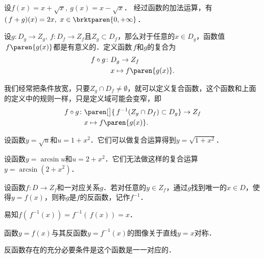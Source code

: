 \begin{example*}
  设\(f(x) = x + \sqrt x,\ g(x) = x - \sqrt x\)．
  经过函数的加法运算，有\((\,f+g)(x) = 2x,\ x \in \brktparen{0, +\infty}\)．
\end{example*}

\begin{definition*}
  设\(g\colon D_g \to Z_g,\ f\colon D_f \to Z_f\)且\(Z_g \subset D_f\)，那么对于任意的\(x \in D_g\)，函数值\(\,f\paren{g(x)}\)都是有意义的．定义函数\(\,f\)和\(g\)的复合为
  \[
    \begin{split}
      f \circ g\colon & D_g \to Z_f \\
      & x \mapsto f\paren{g(x)}.
    \end{split}
  \]

  \begin{remark}
    我们经常把条件放宽，只要\(Z_g \cap D_f \ne \emptyset\)，就可以定义复合函数，这个函数和上面的定义中的规则一样，只是定义域可能会变窄，即
    \[
      \begin{split}
        f \circ g\colon & \paren[\big]{\,f^{-1}(Z_g \cap D_f) \subset D_g} \to Z_f \\
        & x \mapsto f\paren{g(x)}.
      \end{split}
    \]
  \end{remark}
\end{definition*}

\begin{example*}
  设函数\(y = \sqrt u\)和\(u = 1+x^2\)．它们可以做复合运算得到\(y = \sqrt{1+x^2}\)．
\end{example*}

\begin{example*}
  设函数\(y = \arcsin u\)和\(u = 2+x^2\)．它们无法做这样的复合运算\(y = \arcsin(2+x^2)\)．
\end{example*}

\begin{definition}
  \label{defn:funcinv}
  设函数\(f\colon D \to Z_f\)和一对应关系\(g\)．若对任意的\(y \in Z_f\)，通过\(g\)找到唯一的\(x \in D\)，使得\(y = f(x)\)，则称\(g\)是\(f\)的反函数，记作\(f^{-1}\)．
\end{definition}

易知\(f(\,f^{-1}(x)) = f^{-1}(\,f(x)) = x\)．

\begin{theorem*}
  函数\(y = f(x)\)与其反函数\(y = f^{-1}(x)\)的图像关于直线\(y = x\)对称．
\end{theorem*}

\begin{theorem*}
  反函数存在的充分必要条件是这个函数是一一对应的．
\end{theorem*}


